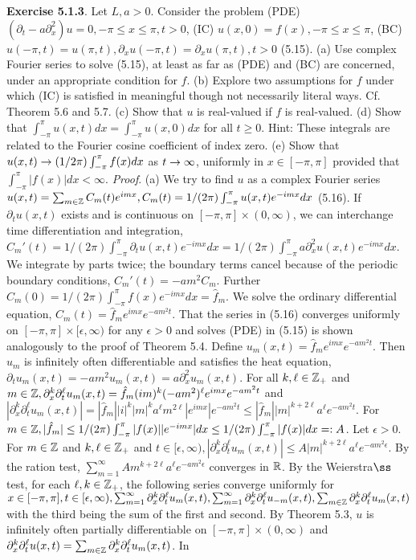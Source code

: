 {\bf Exercise 5.1.3}. Let $L, a > 0$. Consider the problem (PDE) $(\partial_t - a \partial_x^2)u = 0, -\pi \leq x \leq \pi, t > 0$, (IC) $u(x,0)=f(x), -\pi \leq x \leq \pi$, (BC) $u(-\pi,t)=u(\pi,t), \partial_x u(-\pi, t) =\partial_x u(\pi, t), t > 0$ (5.15).  (a) Use complex Fourier series to solve (5.15), at least as far as (PDE) and (BC) are concerned, under an appropriate condition for $f$. (b) Explore two assumptions for $f$ under which (IC) is satisfied in meaningful though not necessarily literal ways. Cf. Theorem 5.6 and 5.7. (c) Show that $u$ is real-valued if $f$ is real-valued. (d) Show that $\int_{-\pi}^{\pi} u(x,t)dx = \int_{-\pi}^{\pi} u(x,0)dx$ for all $t \geq 0$.  Hint: These integrals are related to the Fourier cosine coefficient of index zero.  (e) Show that $u(x,t) \rightarrow (1/2 \pi)\int_{-\pi}^{\pi} f(x)dx$ as $t \rightarrow \infty$, uniformly in $x \in [-\pi,\pi]$ provided that $\int_{-\pi}^{\pi}|f(x)|dx < \infty$. {\it Proof}. (a) We try to find $u$ as a complex Fourier series $u(x,t)=\sum_{m\in \mathbb{Z}} C_m(t)e^{imx}, C_m(t) = 1/(2 \pi)\int_{-\pi}^{\pi} u(x,t)e^{-imx}dx$ (5.16). If $\partial_t u(x,t)$ exists and is continuous on $[-\pi, \pi] \times (0, \infty)$, we can interchange time differentiation and integration, $C_m'(t) = 1/(2\pi) \int_{-\pi}^{\pi} \partial_t u(x,t) e^{-imx} dx = 1/(2\pi) \int_{-\pi}^{\pi} a\partial_x^2 u(x,t) e^{-imx} dx$. We integrate by parts twice; the boundary terms cancel because of the periodic boundary conditions, $C_m'(t) = -a m^2 C_m$. Further $C_m(0) = 1/(2 \pi)\int_{-\pi}^{\pi} f(x) e^{-imx}dx = \hat{f}_m$. We solve the ordinary differential equation, $C_m(t)=\hat{f}_m e^{imx} e^{-am^2t}$. That the series in (5.16) converges uniformly on $[-\pi, \pi] \times [ \epsilon, \infty)$ for any $\epsilon >0$ and solves (PDE) in (5.15) is shown analogously to the proof of Theorem 5.4. Define $u_m(x,t)=\hat{f}_m e^{imx} e^{-am^2t}$. Then $u_m$ is infinitely often differentiable and satisfies the heat equation, $\partial_t u_m(x,t)=-am^2u_m(x,t) =  a \partial_x^2u_m(x,t)$. For all $k, \ell \in \mathbb{Z}_+$ and $m \in \mathbb{Z}, \partial_x^k \partial_t^{\ell} u_m(x,t)=\hat{f}_m(im)^k(-am^2)^{\ell} e^{imx} e^{-am^2 t}$ and $|\partial_x^k \partial_t^{\ell} u_m(x,t)|=|\hat{f}_m| |i|^k |m|^k a^{\ell}m^{2 \ell} |e^{imx}| e^{-am^2 t} \leq |\hat{f}_m|  |m|^{k+2\ell} a^{\ell}  e^{-am^2 t}$. For $m \in \mathbb{Z}, |\hat{f}_m|\leq 1/(2 \pi) \int_{-\pi}^{\pi}|f(x)| |e^{-imx}|dx \leq 1/(2 \pi) \int_{-\pi}^{\pi}|f(x)| dx =: A$. Let $\epsilon > 0$. For $m \in \mathbb{Z}$ and $k, \ell \in \mathbb{Z}_+$ and $t \in [\epsilon, \infty), |\partial_x^k \partial_t^{\ell} u_m(x,t)| \leq A |m|^{k+2 \ell}a^{\ell} e^{-am^2 \epsilon}$. By the ration test, $\sum_{m=1}^{\infty}A m^{k+2\ell}a^{\ell}e^{-am^2 \epsilon}$ converges in $\mathbb{R}$. By the Weierstra$\ss$ test, for each $\ell, k \in \mathbb{Z}_+$, the following series converge uniformly for $x \in [-\pi, \pi], t \in [\epsilon, \infty), \sum_{m=1}^{\infty}\partial_x^k \partial_t^{\ell}u_m(x,t), \sum_{m=1}^{\infty}\partial_x^k \partial_t^{\ell}u_{-m}(x,t), \sum_{m\in \mathbb{Z}} \partial_x^k \partial_t^{\ell}u_m(x,t)$ with the third being the sum of the first and second.  By Theorem 5.3, $u$ is infinitely often partially differentiable on $[-\pi, \pi] \times (0, \infty)$ and $\partial_x^k \partial_t^{\ell}u(x,t) =  \sum_{m\in \mathbb{Z}}\partial_x^k \partial_t^{\ell}u_m(x,t)$. In 